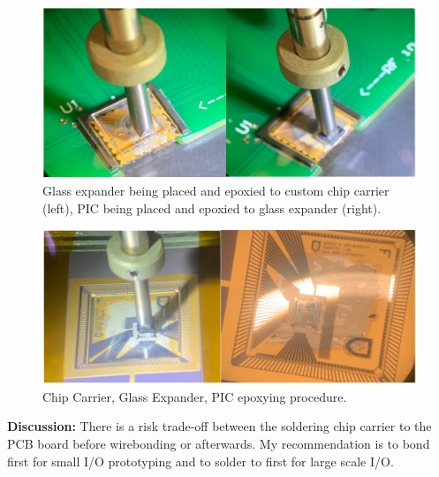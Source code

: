 \begin{figure}[!ht]
\centering
\includegraphics[width=5in]{./Figures/AppendixA/FigAppA13}
\caption[Glass expander being placed and epoxied to custom chip carrier. PIC being placed and epoxied to glass expander.]{Glass expander being placed and epoxied to custom chip carrier (left), PIC being placed and epoxied to glass expander (right).}
\label{FigAppA13}
\end{figure}

\begin{figure}[!ht]
\centering
\includegraphics[width=5in]{./Figures/AppendixA/FigAppA14}
\caption{Chip Carrier, Glass Expander, PIC epoxying procedure.}
\label{FigAppA14}
\end{figure}

\textbf{Discussion:}
\qquad There is a risk trade-off between the soldering chip carrier to the PCB board before wirebonding or afterwards. My recommendation is to bond first for small I/O prototyping and to solder to first for large scale I/O.

